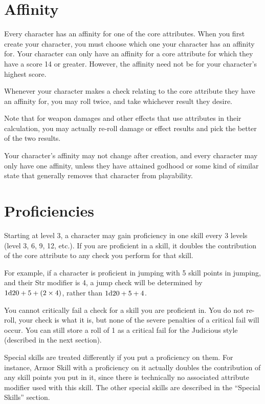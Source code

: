 \section{Affinity}
Every character has an affinity for one of the core attributes. When you first create your character, you must choose which one your character has an affinity for. Your character can only have an affinity for a core attribute for which they have a score 14 or greater. However, the affinity need not be for your character’s highest score.

Whenever your character makes a check relating to the core attribute they have an affinity for, you may roll twice, and take whichever result they desire.

Note that for weapon damages and other effects that use attributes in their calculation, you may actually re-roll damage or effect results and pick the better of the two results.

Your character’s affinity may not change after creation, and every character may only have one affinity, unless they have attained godhood or some kind of similar state that generally removes that character from playability.

\section{Proficiencies}
Starting at level 3, a character may gain proficiency in one skill every 3 levels (level 3, 6, 9, 12, etc.). If you are proficient in a skill, it doubles the contribution of the core attribute to any check you perform for that skill.

For example, if a character is proficient in jumping with 5 skill points in jumping, and their Str modifier is 4, a jump check will be determined by $1\mathrm{d}20 + 5 + (2\times4)$, rather than $1\mathrm{d}20 + 5 + 4$.

You cannot critically fail a check for a skill you are proficient in. You do not re-roll, your check is what it is, but none of the severe penalties of a critical fail will occur. You can still store a roll of 1 as a critical fail for the Judicious style (described in the next section).

Special skills are treated differently if you put a proficiency on them. For instance, Armor Skill with a proficiency on it actually doubles the contribution of any skill points you put in it, since there is technically no associated attribute modifier used with this skill. The other special skills are described in the ``Special Skills'' section.


